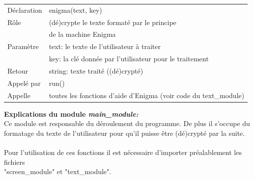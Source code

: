\documentclass[a4paper,12pt,abstracton,titlepage]{scrartcl}
\begin{document}
{\begin{longtable}{ll}
Déclaration & enigma(text, key)\\
Rôle & (dé)crypte le texte formaté par le principe\\
 & de la machine Enigma\\
Paramètre & text: le texte de l'utilisateur à traiter\\
  & key: la clé donnée par l'utilisateur pour le traitement\\
Retour & string: texte traité ((dé)crypté)\\
Appelé par & run()\\
Appelle & toutes les fonctions d'aide d'Enigma (voir code du text\_module)\\
\end{longtable}
\vspace{0.5cm}

\newpage
\textbf{Explications du module \textit{main\_module:}}\\
Ce module est responsable du déroulement du programme. De plus il s'occupe du formatage du texte de l'utilisateur pour qu'il puisse être (dé)crypté par la suite.\\
\\
Pour l'utilisation de ces fonctions il est nécessaire d'importer préalablement les fichiers\\
"screen\_module" et "text\_module".
\vspace{0.3cm}

}
\end{document}
